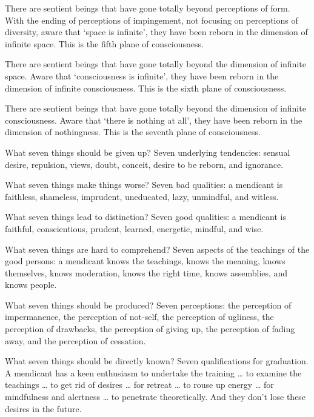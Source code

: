 \documentclass[12pt,openany]{book}%
\begin{document}
There are sentient beings that have gone totally beyond perceptions of form. With the ending of perceptions of impingement, not focusing on perceptions of diversity, aware that ‘space is infinite’, they have been reborn in the dimension of infinite space. This is the fifth plane of consciousness. 

There are sentient beings that have gone totally beyond the dimension of infinite space. Aware that ‘consciousness is infinite’, they have been reborn in the dimension of infinite consciousness. This is the sixth plane of consciousness. 

There are sentient beings that have gone totally beyond the dimension of infinite consciousness. Aware that ‘there is nothing at all’, they have been reborn in the dimension of nothingness. This is the seventh plane of consciousness. 

What seven things should be given up? Seven underlying tendencies: sensual desire, repulsion, views, doubt, conceit, desire to be reborn, and ignorance. 

What seven things make things worse? Seven bad qualities: a mendicant is faithless, shameless, imprudent, uneducated, lazy, unmindful, and witless. 

What seven things lead to distinction? Seven good qualities: a mendicant is faithful, conscientious, prudent, learned, energetic, mindful, and wise. 

What seven things are hard to comprehend? Seven aspects of the teachings of the good persons: a mendicant knows the teachings, knows the meaning, knows themselves, knows moderation, knows the right time, knows assemblies, and knows people. 

What seven things should be produced? Seven perceptions: the perception of impermanence, the perception of not-self, the perception of ugliness, the perception of drawbacks, the perception of giving up, the perception of fading away, and the perception of cessation. 

What seven things should be directly known? Seven qualifications for graduation. A mendicant has a keen enthusiasm to undertake the training … to examine the teachings … to get rid of desires … for retreat … to rouse up energy … for mindfulness and alertness … to penetrate theoretically. And they don’t lose these desires in the future. 
\end{document}
